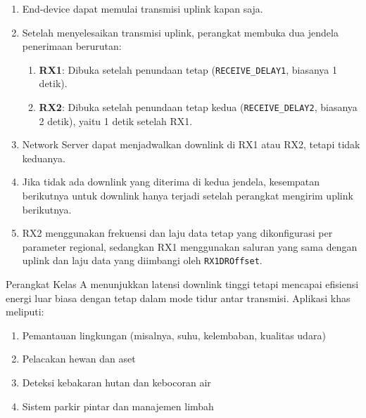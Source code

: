 \begin{enumerate}
    \item End-device dapat memulai transmisi uplink kapan saja.
    \item Setelah menyelesaikan transmisi uplink, perangkat membuka dua jendela penerimaan berurutan:
          \begin{enumerate}
              \item \textbf{RX1}: Dibuka setelah penundaan tetap (\texttt{RECEIVE\_DELAY1}, biasanya 1 detik).
              \item \textbf{RX2}: Dibuka setelah penundaan tetap kedua (\texttt{RECEIVE\_DELAY2}, biasanya 2 detik), yaitu 1 detik setelah RX1.
          \end{enumerate}
    \item Network Server dapat menjadwalkan downlink di RX1 atau RX2, tetapi tidak keduanya.
    \item Jika tidak ada downlink yang diterima di kedua jendela, kesempatan berikutnya untuk downlink hanya terjadi setelah perangkat mengirim uplink berikutnya.
    \item RX2 menggunakan frekuensi dan laju data tetap yang dikonfigurasi per parameter regional, sedangkan RX1 menggunakan saluran yang sama dengan uplink dan laju data yang diimbangi oleh \texttt{RX1DROffset}.
\end{enumerate}
Perangkat Kelas A menunjukkan latensi downlink tinggi tetapi mencapai efisiensi energi luar biasa dengan tetap dalam mode tidur antar transmisi. Aplikasi khas meliputi:
\begin{enumerate}
    \item Pemantauan lingkungan (misalnya, suhu, kelembaban, kualitas udara)
    \item Pelacakan hewan dan aset
    \item Deteksi kebakaran hutan dan kebocoran air
    \item Sistem parkir pintar dan manajemen limbah
\end{enumerate}
